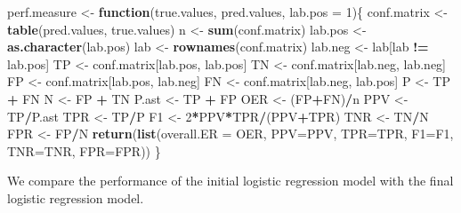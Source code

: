 \documentclass[
]{article}
\newenvironment{Shaded}{\begin{snugshade}}{\end{snugshade}}
\newcommand{\AttributeTok}[1]{\textcolor[rgb]{0.13,0.29,0.53}{#1}}
\newcommand{\ControlFlowTok}[1]{\textcolor[rgb]{0.13,0.29,0.53}{\textbf{#1}}}
\newcommand{\DecValTok}[1]{\textcolor[rgb]{0.00,0.00,0.81}{#1}}
\newcommand{\FunctionTok}[1]{\textcolor[rgb]{0.13,0.29,0.53}{\textbf{#1}}}
\newcommand{\NormalTok}[1]{#1}
\newcommand{\OtherTok}[1]{\textcolor[rgb]{0.56,0.35,0.01}{#1}}
\newcommand{\SpecialCharTok}[1]{\textcolor[rgb]{0.81,0.36,0.00}{\textbf{#1}}}
\begin{document}
\begin{Shaded}
\begin{Highlighting}[]
\NormalTok{perf.measure }\OtherTok{\textless{}{-}} \ControlFlowTok{function}\NormalTok{(true.values, pred.values,  }\AttributeTok{lab.pos =} \DecValTok{1}\NormalTok{)\{}
\NormalTok{  conf.matrix }\OtherTok{\textless{}{-}} \FunctionTok{table}\NormalTok{(pred.values, true.values)}
\NormalTok{  n }\OtherTok{\textless{}{-}} \FunctionTok{sum}\NormalTok{(conf.matrix)}
\NormalTok{  lab.pos }\OtherTok{\textless{}{-}} \FunctionTok{as.character}\NormalTok{(lab.pos)}
\NormalTok{  lab }\OtherTok{\textless{}{-}} \FunctionTok{rownames}\NormalTok{(conf.matrix)}
\NormalTok{  lab.neg }\OtherTok{\textless{}{-}}\NormalTok{ lab[lab }\SpecialCharTok{!=}\NormalTok{ lab.pos]}
\NormalTok{  TP }\OtherTok{\textless{}{-}}\NormalTok{ conf.matrix[lab.pos, lab.pos]}
\NormalTok{  TN }\OtherTok{\textless{}{-}}\NormalTok{ conf.matrix[lab.neg, lab.neg]}
\NormalTok{  FP }\OtherTok{\textless{}{-}}\NormalTok{ conf.matrix[lab.pos, lab.neg]}
\NormalTok{  FN }\OtherTok{\textless{}{-}}\NormalTok{ conf.matrix[lab.neg, lab.pos]}
\NormalTok{  P     }\OtherTok{\textless{}{-}}\NormalTok{ TP }\SpecialCharTok{+}\NormalTok{ FN}
\NormalTok{  N     }\OtherTok{\textless{}{-}}\NormalTok{ FP }\SpecialCharTok{+}\NormalTok{ TN}
\NormalTok{  P.ast }\OtherTok{\textless{}{-}}\NormalTok{ TP }\SpecialCharTok{+}\NormalTok{ FP}
\NormalTok{  OER }\OtherTok{\textless{}{-}}\NormalTok{ (FP}\SpecialCharTok{+}\NormalTok{FN)}\SpecialCharTok{/}\NormalTok{n}
\NormalTok{  PPV }\OtherTok{\textless{}{-}}\NormalTok{ TP}\SpecialCharTok{/}\NormalTok{P.ast}
\NormalTok{  TPR }\OtherTok{\textless{}{-}}\NormalTok{ TP}\SpecialCharTok{/}\NormalTok{P}
\NormalTok{  F1  }\OtherTok{\textless{}{-}} \DecValTok{2}\SpecialCharTok{*}\NormalTok{PPV}\SpecialCharTok{*}\NormalTok{TPR}\SpecialCharTok{/}\NormalTok{(PPV}\SpecialCharTok{+}\NormalTok{TPR)}
\NormalTok{  TNR }\OtherTok{\textless{}{-}}\NormalTok{ TN}\SpecialCharTok{/}\NormalTok{N}
\NormalTok{  FPR }\OtherTok{\textless{}{-}}\NormalTok{ FP}\SpecialCharTok{/}\NormalTok{N}
  \FunctionTok{return}\NormalTok{(}\FunctionTok{list}\NormalTok{(}\AttributeTok{overall.ER =}\NormalTok{ OER, }\AttributeTok{PPV=}\NormalTok{PPV, }\AttributeTok{TPR=}\NormalTok{TPR, }\AttributeTok{F1=}\NormalTok{F1, }\AttributeTok{TNR=}\NormalTok{TNR, }\AttributeTok{FPR=}\NormalTok{FPR))}
\NormalTok{\}}
\end{Highlighting}
\end{Shaded}

We compare the performance of the initial logistic regression model with
the final logistic regression model.
\end{document}
